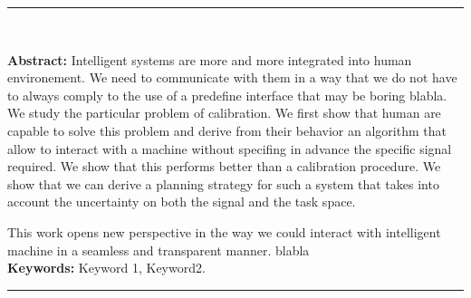 
\begin{vcenterpage}
\noindent\rule[2pt]{\textwidth}{0.5pt}
\begin{center}
{\large\textbf{\thesistitle\\}}
\end{center}
{\large\textbf{Abstract:}} Intelligent systems are more and more integrated into human environement. We need to communicate with them in a way that we do not have to always comply to the use of a predefine interface that may be boring blabla. We study the particular problem of calibration. We first show that human are capable to solve this problem and derive from their behavior an algorithm that allow to interact with a machine without specifing in advance the specific signal required. We show that this performs better than a calibration procedure. We show that we can derive a planning strategy for such a system that takes into account the uncertainty on both the signal and the task space.

This work opens new perspective in the way we could interact with intelligent machine in a seamless and transparent manner. blabla\\

{\large\textbf{Keywords:}}
Keyword 1, Keyword2.\\

\noindent\rule[2pt]{\textwidth}{0.5pt}
\end{vcenterpage}